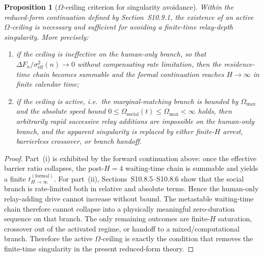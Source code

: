 \documentclass[11pt]{article}
\newtheorem{proposition}{Proposition}
\begin{document}
\begin{proposition}[\(\Omega\)-ceiling criterion for singularity avoidance]
\label{prop:omega_ceiling_singularity_avoidance}
Within the reduced-form continuation defined by Section~S10.9.1,
the existence of an active \(\Omega\)-ceiling is necessary and sufficient for
avoiding a finite-time relay-depth singularity.
More precisely:
\begin{enumerate}[label=(\roman*)]
\item if the ceiling is ineffective on the human-only branch, so that
\(\Delta F_n/\sigma_{\mathrm{eff}}^2(n)\to 0\) without compensating rate limitation,
then the residence-time chain becomes summable and the formal continuation
reaches \(H\to\infty\) in finite calendar time;
\item if the ceiling is active, i.e.\ the marginal-matching branch is bounded by
\(\Omega_{\max}\) and the absolute speed bound
\(0\le \Omega_{\mathrm{social}}(t)\le \Omega_{\max}<\infty\) holds,
then arbitrarily rapid successive relay additions are impossible on the
human-only branch, and the apparent singularity is replaced by either
finite-\(H\) arrest, barrierless crossover, or branch handoff.
\end{enumerate}
\end{proposition}

\begin{proof}
Part~(i) is exhibited by the forward continuation above:
once the effective barrier ratio collapses, the post-\(H=4\) waiting-time chain
is summable and yields a finite \(t_{H\to\infty}^{\mathrm{(formal)}}\).
For part~(ii), Sections~S10.8.5--S10.8.6 show that the social branch is
rate-limited both in relative and absolute terms.
Hence the human-only relay-adding drive cannot increase without bound.
The metastable waiting-time chain therefore cannot collapse into a physically
meaningful zero-duration sequence on that branch.
The only remaining outcomes are finite-\(H\) saturation, crossover out of the
activated regime, or handoff to a mixed/computational branch.
Therefore the active \(\Omega\)-ceiling is exactly the condition that removes
the finite-time singularity in the present reduced-form theory.
\end{proof}

\end{document}
